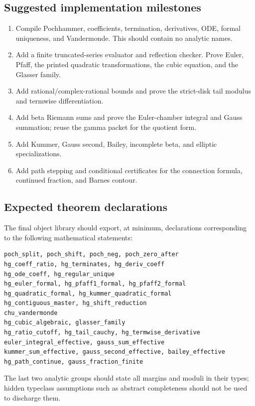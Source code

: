 \subsection{Suggested implementation milestones}

\begin{enumerate}[label=\textbf{M\arabic*.}]
\item Compile Pochhammer, coefficients, termination, derivatives, ODE,
formal uniqueness, and Vandermonde.  This should contain no analytic names.
\item Add a finite truncated-series evaluator and reflection checker.  Prove
Euler, Pfaff, the printed quadratic transformations, the cubic equation, and
the Glasser family.
\item Add rational/complex-rational bounds and prove the strict-disk tail
modulus and termwise differentiation.
\item Add beta Riemann sums and prove the Euler-chamber integral and Gauss
summation; reuse the gamma packet for the quotient form.
\item Add Kummer, Gauss second, Bailey, incomplete beta, and elliptic
specializations.
\item Add path stepping and conditional certificates for the connection
formula, continued fraction, and Barnes contour.
\end{enumerate}

\subsection{Expected theorem declarations}

The final object library should export, at minimum, declarations corresponding
to the following mathematical statements:
\begin{lstlisting}[language={}]
poch_split, poch_shift, poch_neg, poch_zero_after
hg_coeff_ratio, hg_terminates, hg_deriv_coeff
hg_ode_coeff, hg_regular_unique
hg_euler_formal, hg_pfaff1_formal, hg_pfaff2_formal
hg_quadratic_formal, hg_kummer_quadratic_formal
hg_contiguous_master, hg_shift_reduction
chu_vandermonde
hg_cubic_algebraic, glasser_family
hg_ratio_cutoff, hg_tail_cauchy, hg_termwise_derivative
euler_integral_effective, gauss_sum_effective
kummer_sum_effective, gauss_second_effective, bailey_effective
hg_path_continue, gauss_fraction_finite
\end{lstlisting}
The last two analytic groups should state all margins and moduli in their
types; hidden typeclass assumptions such as abstract completeness should not
be used to discharge them.

